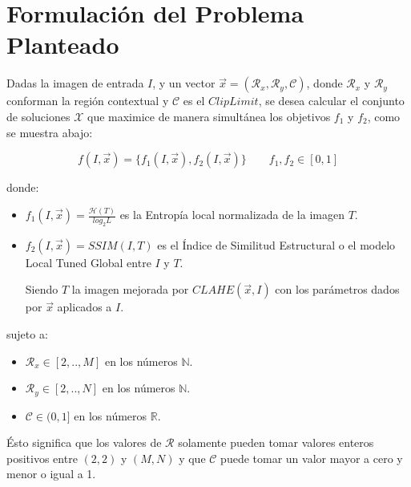 \documentclass[spanish,twocolumn]{article}
\begin{document}
\section{Formulación del Problema Planteado}
\label{sec:formulacion}
Dadas la imagen de entrada $I$, y un vector $\overrightarrow{x}=(\mathcal{R}_x, \mathcal{R}_y, \mathcal{C})$, donde $\mathcal{R}_x$ y $\mathcal{R}_y$ conforman la región contextual y $\mathscr{C}$ es el $Clip Limit$, se desea calcular el conjunto de soluciones $\mathscr{X}$ que maximice de manera simultánea los objetivos $f_1$ y $f_2$, como se muestra abajo:

\begin{equation}\label{eq:fitness}
    f(I, \overrightarrow{x}) = \{ f_1(I, \overrightarrow{x}), f_2(I, \overrightarrow{x}) \} \qquad f_1,f_2 \in [0,1]
\end{equation}

donde:
\begin{itemize}
\item $f_{1}(I, \overrightarrow{x})=\frac{\mathscr{H}(T)}{log_{2}L}$ es la Entropía local normalizada de la imagen $T$.
\item $f_{2}(I, \overrightarrow{x})=SSIM(I,T)$ es el Índice de Similitud Estructural o  el modelo Local Tuned Global  entre $I$ y $T$.

Siendo $T$ la imagen mejorada por $CLAHE(\overrightarrow{x},I)$ con los parámetros dados por $\overrightarrow{x}$ aplicados a $I$.

\end{itemize}

sujeto a:

\begin{itemize}
\item $\mathcal{R}_x \in [2,..,M]$ en los números $\mathbb{N}$.
\item $\mathcal{R}_y \in [2,..,N]$ en los números $\mathbb{N}$.
\item $\mathscr{C} \in (0,1]$ en los números $\mathbb{R}$.
\end{itemize}

Ésto significa que los valores de $\mathcal{R}$ solamente pueden tomar valores enteros positivos entre $(2,2)$ y $(M,N)$ y que $\mathscr{C}$ puede tomar un valor mayor a cero y menor o igual a 1.
\end{document}
